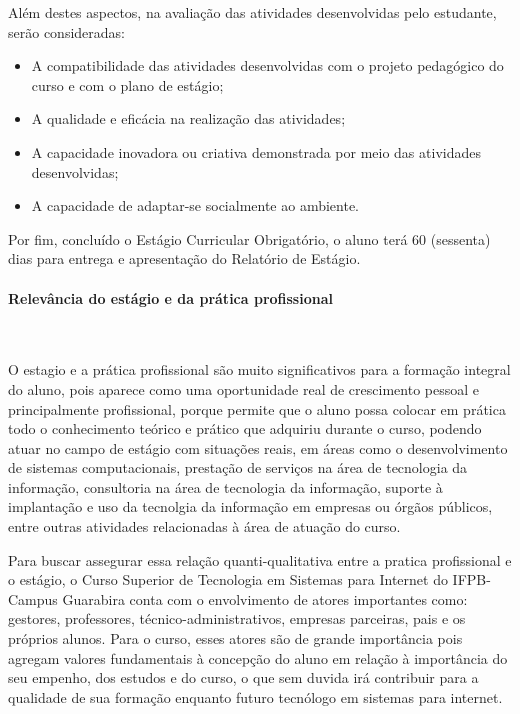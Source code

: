            Além destes aspectos, na avaliação das atividades desenvolvidas pelo estudante, serão consideradas:

\begin{itemize}
	\item A compatibilidade das atividades desenvolvidas com o projeto pedagógico do curso e com o plano de estágio;
	\item A qualidade e eficácia na realização das atividades;
	\item A capacidade inovadora ou criativa demonstrada por meio das atividades desenvolvidas;
	\item A capacidade de adaptar-se socialmente ao ambiente.
\end{itemize}

      Por fim, concluído o Estágio Curricular Obrigatório, o aluno terá 60 (sessenta) dias para entrega e apresentação do Relatório de Estágio.

\paragraph{Relevância do estágio e da prática profissional}\
 
      O estagio e a prática profissional são muito significativos para a formação integral do aluno, pois aparece como uma oportunidade real de crescimento pessoal e principalmente profissional, porque permite que o aluno possa colocar em prática todo o conhecimento teórico e prático que adquiriu durante o curso, podendo atuar no campo de estágio com situações reais, em áreas como o desenvolvimento de sistemas computacionais, prestação de serviços na área de tecnologia da informação, consultoria na área de tecnologia da informação, suporte à implantação e uso da tecnolgia da informação em empresas ou órgãos públicos, entre outras atividades relacionadas à área de atuação do curso.
	  
Para buscar assegurar essa relação quanti-qualitativa entre a pratica profissional e o estágio, o Curso Superior de Tecnologia em Sistemas para Internet do IFPB-Campus Guarabira conta com o envolvimento de atores importantes como: gestores, professores, técnico-administrativos, empresas parceiras, pais e os próprios alunos.  Para o curso, esses atores são de grande importância pois agregam valores fundamentais à concepção do aluno em relação à importância do seu empenho, dos estudos e do curso, o que sem duvida irá contribuir para a qualidade de sua formação enquanto futuro tecnólogo em sistemas para internet. 


